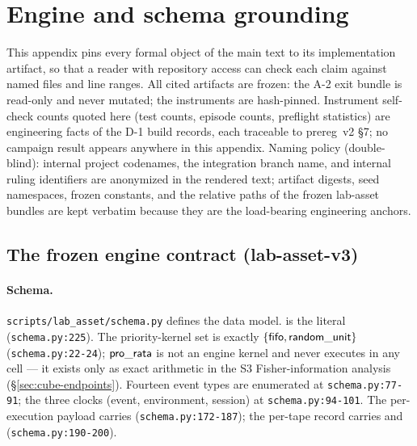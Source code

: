 \section{Engine and schema grounding}
\label{app:engine}

\begingroup\sloppy

This appendix pins every formal object of the main text to its
implementation artifact, so that a reader with repository access can check
each claim against named files and line ranges. All cited artifacts are
frozen: the A-2 exit bundle is read-only and never mutated; the instruments
are hash-pinned. Instrument self-check counts quoted here (test counts,
episode counts, preflight statistics) are engineering facts of the D-1 build
records, each traceable to prereg~v2 \S7; no campaign result appears
anywhere in this appendix. Naming policy (double-blind): internal project
codenames, the integration branch name, and internal ruling identifiers are
anonymized in the rendered text; artifact digests, seed namespaces, frozen
constants, and the relative paths of the frozen lab-asset bundles are kept
verbatim because they are the load-bearing engineering anchors.

\subsection{The frozen engine contract (lab-asset-v3)}
\label{app:engine-contract}

\paragraph{Schema.}
\texttt{scripts/lab\_asset/schema.py} defines the data model.
 is the literal 
(\texttt{schema.py:225}). The priority-kernel set is exactly
$\{\mathsf{fifo}, \mathsf{random\_unit}\}$ (\texttt{schema.py:22-24}); $\mathsf{pro\_rata}$ is not an
engine kernel and never executes in any cell --- it exists only as exact
arithmetic in the S3 Fisher-information analysis
(\S\ref{sec:cube-endpoints}). Fourteen event types are enumerated at
\texttt{schema.py:77-91}; the three clocks (event, environment, session) at
\texttt{schema.py:94-101}. The per-execution payload carries
 (\texttt{schema.py:172-187}); the per-tape record
carries  and
 (\texttt{schema.py:190-200}).

